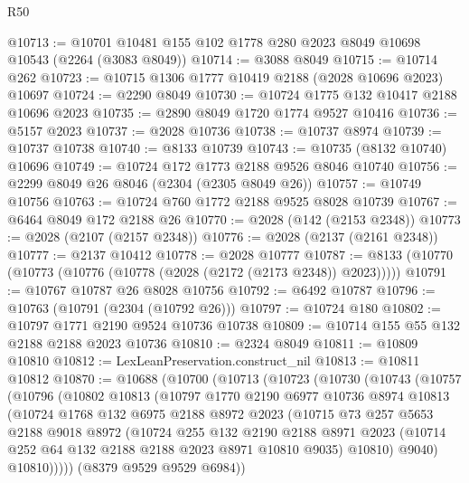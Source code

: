 \begin{lexlean}{R50}
\begin{coremodule}
@10713 := @10701 @10481 @155 @102 @1778 @280 @2023 @8049 @10698 @10543 (@2264 (@3083 @8049))
@10714 := @3088 @8049
@10715 := @10714 @262
@10723 := @10715 @1306 @1777 @10419 @2188 (@2028 @10696 @2023) @10697
@10724 := @2290 @8049
@10730 := @10724 @1775 @132 @10417 @2188 @10696 @2023
@10735 := @2890 @8049 @1720 @1774 @9527 @10416
@10736 := @5157 @2023
@10737 := @2028 @10736
@10738 := @10737 @8974
@10739 := @10737 @10738
@10740 := @8133 @10739
@10743 := @10735 (@8132 @10740) @10696
@10749 := @10724 @172 @1773 @2188 @9526 @8046 @10740
@10756 := @2299 @8049 @26 @8046 (@2304 (@2305 @8049 @26))
@10757 := @10749 @10756
@10763 := @10724 @760 @1772 @2188 @9525 @8028 @10739
@10767 := @6464 @8049 @172 @2188 @26
@10770 := @2028 (@142 (@2153 @2348))
@10773 := @2028 (@2107 (@2157 @2348))
@10776 := @2028 (@2137 (@2161 @2348))
@10777 := @2137 @10412
@10778 := @2028 @10777
@10787 := @8133 (@10770 (@10773 (@10776 (@10778 (@2028 (@2172 (@2173 @2348)) @2023)))))
@10791 := @10767 @10787 @26 @8028 @10756
@10792 := @6492 @10787
@10796 := @10763 (@10791 (@2304 (@10792 @26)))
@10797 := @10724 @180
@10802 := @10797 @1771 @2190 @9524 @10736 @10738
@10809 := @10714 @155 @55 @132 @2188 @2188 @2023 @10736
@10810 := @2324 @8049
@10811 := @10809 @10810
@10812 := LexLeanPreservation.construct_nil
@10813 := @10811 @10812
@10870 := @10688
    (@10700
      (@10713
        (@10723
          (@10730
            (@10743
              (@10757
                (@10796
                  (@10802
                    @10813
                    (@10797
                      @1770
                      @2190
                      @6977
                      @10736
                      @8974
                      @10813
                      (@10724
                        @1768
                        @132
                        @6975
                        @2188
                        @8972
                        @2023
                        (@10715
                          @73
                          @257
                          @5653
                          @2188
                          @9018
                          @8972
                          (@10724
                            @255
                            @132
                            @2190
                            @2188
                            @8971
                            @2023
                            (@10714 @252 @64 @132 @2188 @2188 @2023 @8971 @10810 @9035)
                            @10810)
                          @9040)
                        @10810)))))
              (@8379 @9529 @9529 @6984))

\end{coremodule}
\end{lexlean}
